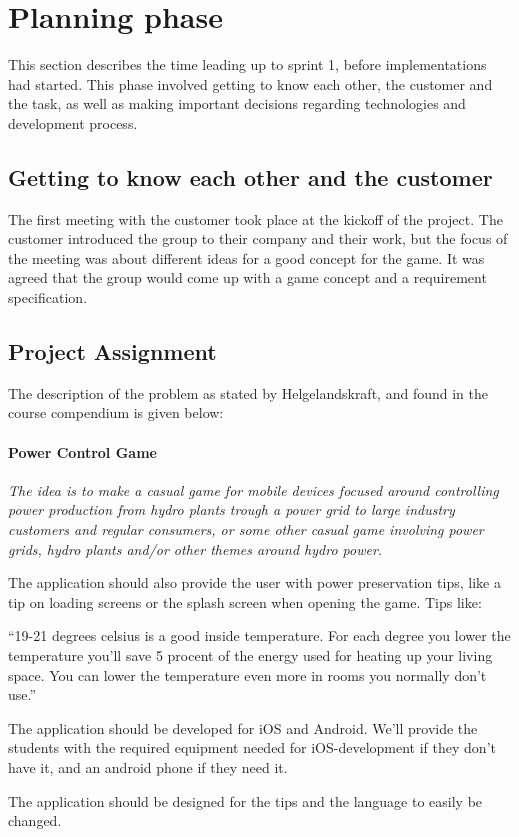 \section{Planning phase}

	This section describes the time leading up to sprint 1, before implementations had started. This phase involved getting to know each other, the customer and the task, as well as making important decisions regarding technologies and development process.

\subsection{Getting to know each other and the customer}

	The first meeting with the customer took place at the kickoff of the project. 
	The customer introduced the group to their company and their work, but the focus 
	of the meeting was about different ideas for a good concept for the game.
	It was agreed that the group would come up with a game concept and a requirement 
	specification.

\subsection{Project Assignment}
	
	The description of the problem as stated by Helgelandskraft, 
	and found in the course compendium is given below: 
		\paragraph{Power Control Game}
		{\it The idea is to make a casual game for mobile devices focused around controlling 
		power production from hydro plants trough a power grid to large industry customers and 
		regular consumers, or some other casual game involving power grids, hydro plants 
		and/or other themes around hydro power. 
		 
		The application should also provide the user with power preservation tips, like a 
		tip on loading screens or the splash screen when opening the game. Tips like: 
		 
		“19-21 degrees celsius is a good inside temperature. For each degree you lower the temperature 
		you’ll save 5 procent of the energy used for heating up your living space. 
		You can lower the temperature even more in rooms you normally don’t use.” 
		 
		The application should be developed for iOS and Android. We’ll provide the 
		students with the required equipment needed for iOS-development if they don’t 
		have it, and an android phone if they need it. 
		 
		The application should be designed for the tips and the language to easily be changed.}

